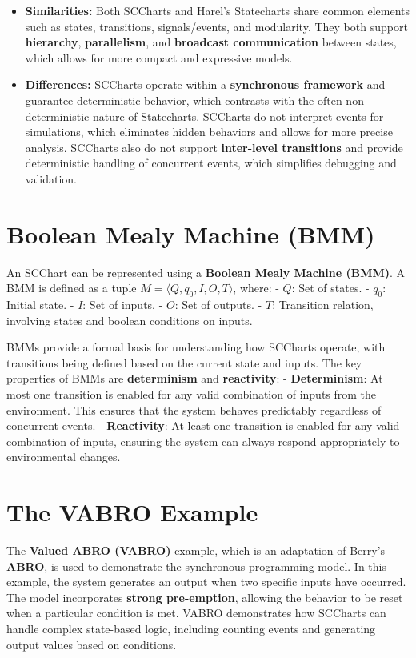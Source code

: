 \documentclass[
  14pt,
  a4paper,
  DIV=11,
  numbers=noendperiod,
  headinclude=true,
  footinclude=true]{scrreprt}
\providecommand{\tightlist}{%
  \setlength{\itemsep}{0pt}\setlength{\parskip}{0pt}}\usepackage{longtable,booktabs,array}
\begin{document}
\begin{itemize}
\tightlist
\item
  \textbf{Similarities:} Both SCCharts and Harel's Statecharts share
  common elements such as states, transitions, signals/events, and
  modularity. They both support \textbf{hierarchy},
  \textbf{parallelism}, and \textbf{broadcast communication} between
  states, which allows for more compact and expressive models.
\item
  \textbf{Differences:} SCCharts operate within a \textbf{synchronous
  framework} and guarantee deterministic behavior, which contrasts with
  the often non-deterministic nature of Statecharts. SCCharts do not
  interpret events for simulations, which eliminates hidden behaviors
  and allows for more precise analysis. SCCharts also do not support
  \textbf{inter-level transitions} and provide deterministic handling of
  concurrent events, which simplifies debugging and validation.
\end{itemize}

\section{Boolean Mealy Machine (BMM)}\label{boolean-mealy-machine-bmm}

An SCChart can be represented using a \textbf{Boolean Mealy Machine
(BMM)}. A BMM is defined as a tuple
\(M = \langle Q, q_0, I, O, T \rangle\), where: - \(Q\): Set of states.
- \(q_0\): Initial state. - \(I\): Set of inputs. - \(O\): Set of
outputs. - \(T\): Transition relation, involving states and boolean
conditions on inputs.

BMMs provide a formal basis for understanding how SCCharts operate, with
transitions being defined based on the current state and inputs. The key
properties of BMMs are \textbf{determinism} and \textbf{reactivity}: -
\textbf{Determinism}: At most one transition is enabled for any valid
combination of inputs from the environment. This ensures that the system
behaves predictably regardless of concurrent events. -
\textbf{Reactivity}: At least one transition is enabled for any valid
combination of inputs, ensuring the system can always respond
appropriately to environmental changes.

\section{The VABRO Example}\label{the-vabro-example}

The \textbf{Valued ABRO (VABRO)} example, which is an adaptation of
Berry's \textbf{ABRO}, is used to demonstrate the synchronous
programming model. In this example, the system generates an output when
two specific inputs have occurred. The model incorporates \textbf{strong
pre-emption}, allowing the behavior to be reset when a particular
condition is met. VABRO demonstrates how SCCharts can handle complex
state-based logic, including counting events and generating output
values based on conditions.
\end{document}
